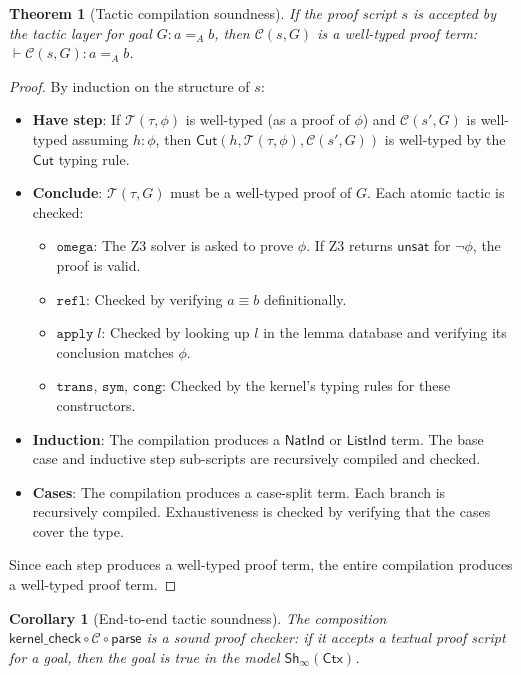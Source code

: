 \documentclass[11pt,a4paper]{report}
\theoremstyle{definition}
\theoremstyle{plain}
\newtheorem{theorem}[definition]{Theorem}
\newtheorem{corollary}[definition]{Corollary}
\newcommand{\Cut}{\mathsf{Cut}}
\newcommand{\Ctx}{\mathsf{Ctx}}
\newcommand{\Sh}{\mathsf{Sh}}
\begin{document}
\begin{theorem}[Tactic compilation soundness]
\label{thm:tactic-soundness}
If the proof script $s$ is accepted by the tactic layer for goal $G : a =_A b$,
then $\mathcal{C}(s, G)$ is a well-typed proof term:
$\vdash \mathcal{C}(s, G) : a =_A b$.
\end{theorem}
\begin{proof}
By induction on the structure of $s$:
\begin{itemize}
  \item \textbf{Have step}: If $\mathcal{T}(\tau, \phi)$ is well-typed (as a
    proof of $\phi$) and $\mathcal{C}(s', G)$ is well-typed assuming $h : \phi$,
    then $\Cut(h, \mathcal{T}(\tau, \phi), \mathcal{C}(s', G))$ is well-typed
    by the $\Cut$ typing rule.
  \item \textbf{Conclude}: $\mathcal{T}(\tau, G)$ must be a well-typed proof of
    $G$.  Each atomic tactic is checked:
    \begin{itemize}
      \item $\mathtt{omega}$: The Z3 solver is asked to prove $\phi$.  If Z3
        returns $\mathsf{unsat}$ for $\neg\phi$, the proof is valid.
      \item $\mathtt{refl}$: Checked by verifying $a \equiv b$ definitionally.
      \item $\mathtt{apply}\;l$: Checked by looking up $l$ in the lemma
        database and verifying its conclusion matches $\phi$.
      \item $\mathtt{trans}$, $\mathtt{sym}$, $\mathtt{cong}$: Checked by the
        kernel's typing rules for these constructors.
    \end{itemize}
  \item \textbf{Induction}: The compilation produces a $\mathsf{NatInd}$ or
    $\mathsf{ListInd}$ term.  The base case and inductive step sub-scripts are
    recursively compiled and checked.
  \item \textbf{Cases}: The compilation produces a case-split term.  Each
    branch is recursively compiled.  Exhaustiveness is checked by verifying
    that the cases cover the type.
\end{itemize}
Since each step produces a well-typed proof term, the entire compilation
produces a well-typed proof term.
\end{proof}

\begin{corollary}[End-to-end tactic soundness]
The composition $\mathsf{kernel\_check} \circ \mathcal{C} \circ \mathsf{parse}$
is a sound proof checker: if it accepts a textual proof script for a goal,
then the goal is true in the model $\Sh_\infty(\Ctx)$.
\end{corollary}
\end{document}
